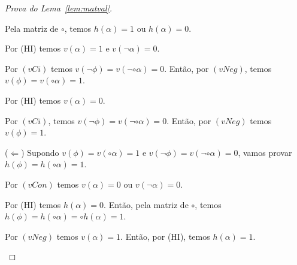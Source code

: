 \begin{proof}[Prova do Lema~\ref{lem:matval}]
\begin{provaporcasos}
\begin{provaporsubcasos}
                        Pela matriz de $\circ$, temos $h(\alpha) = 1$ ou $h(\alpha) = 0$.

                        \begin{provaporsubsubcasos}
                                
                                Por (HI) temos $v(\alpha) = 1$ e $v(\neg \alpha) = 0$.
                            
                                Por $(vCi)$ temos $v(\neg \phi) = v(\neg \circ \alpha) = 0$. Então, por $(vNeg)$, temos $v(\phi) = v(\circ \alpha) = 1$.
                            
                                
                                Por (HI) temos $v(\alpha) = 0$.
                            
                                Por $(vCi)$, temos $v(\neg \phi) = v(\neg \circ \alpha) = 0$. Então, por $(vNeg)$ temos $v(\phi) = 1$.

                                \setcounter{buffer}{\theSubSubCasos}
                        \end{provaporsubsubcasos}
                        
                        ($\Longleftarrow$) Supondo $v(\phi) = v(\circ \alpha) = 1$ e $v(\neg \phi) = v(\neg \circ \alpha) = 0$, vamos provar $h(\phi) = h(\circ \alpha) = 1$.
                        
                        Por $(vCon)$ temos $v(\alpha) = 0$ ou $v(\neg \alpha) = 0$.

                        \begin{provaporsubsubcasos}
                            \setcounter{SubSubCasos}{\thebuffer}


                                Por (HI) temos $h(\alpha) = 0$. Então, pela matriz de $\circ$, temos $h(\phi) = h(\circ \alpha) = \circ h(\alpha) = 1$.
                            

                                Por $(vNeg)$ temos $v(\alpha) = 1$. Então, por (HI), temos $h(\alpha) = 1$. 
                                

\end{provaporsubsubcasos}
\end{provaporsubcasos}
\end{provaporcasos}
\end{proof}
